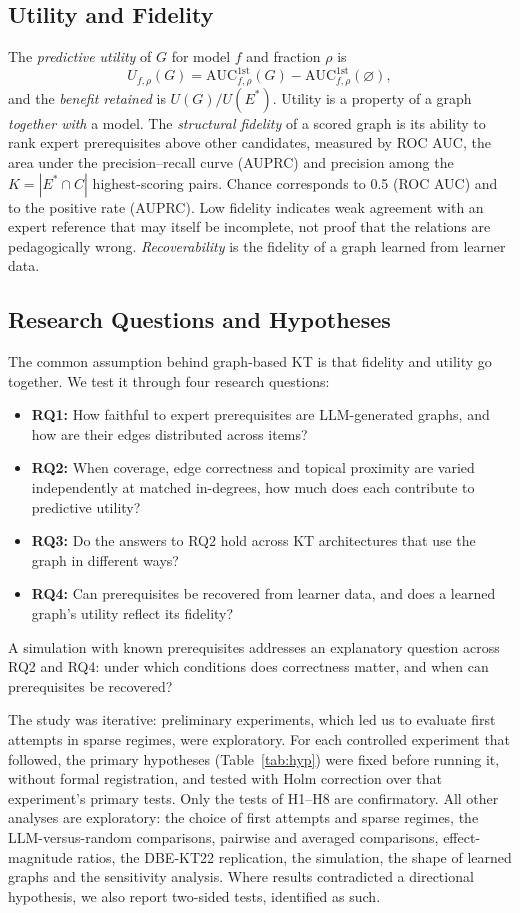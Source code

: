 \documentclass[lettersize,journal]{IEEEtran}
\newcommand{\aucfa}{\mathrm{AUC}^{\mathrm{1st}}}
\begin{document}
\subsection{Utility and Fidelity}
The \emph{predictive utility} of $G$ for model $f$ and fraction $\rho$ is
\begin{equation}
U_{f,\rho}(G)=\aucfa_{f,\rho}(G)-\aucfa_{f,\rho}(\varnothing),
\end{equation}
and the \emph{benefit retained} is $U(G)/U(E^*)$. Utility is a property of a graph \emph{together with} a model. The \emph{structural fidelity} of a scored graph is its ability to rank expert prerequisites above other candidates, measured by ROC AUC, the area under the precision--recall curve (AUPRC) and precision among the $K=|E^*\cap C|$ highest-scoring pairs. Chance corresponds to 0.5 (ROC AUC) and to the positive rate (AUPRC). Low fidelity indicates weak agreement with an expert reference that may itself be incomplete, not proof that the relations are pedagogically wrong. \emph{Recoverability} is the fidelity of a graph learned from learner data.

\subsection{Research Questions and Hypotheses}
The common assumption behind graph-based KT is that fidelity and utility go together. We test it through four research questions:
\begin{itemize}
\item \textbf{RQ1:} How faithful to expert prerequisites are LLM-generated graphs, and how are their edges distributed across items?
\item \textbf{RQ2:} When coverage, edge correctness and topical proximity are varied independently at matched in-degrees, how much does each contribute to predictive utility?
\item \textbf{RQ3:} Do the answers to RQ2 hold across KT architectures that use the graph in different ways?
\item \textbf{RQ4:} Can prerequisites be recovered from learner data, and does a learned graph's utility reflect its fidelity?
\end{itemize}
A simulation with known prerequisites addresses an explanatory question across RQ2 and RQ4: under which conditions does correctness matter, and when can prerequisites be recovered?

The study was iterative: preliminary experiments, which led us to evaluate first attempts in sparse regimes, were exploratory. For each controlled experiment that followed, the primary hypotheses (Table~\ref{tab:hyp}) were fixed before running it, without formal registration, and tested with Holm correction over that experiment's primary tests. Only the tests of H1--H8 are confirmatory. All other analyses are exploratory: the choice of first attempts and sparse regimes, the LLM-versus-random comparisons, pairwise and averaged comparisons, effect-magnitude ratios, the DBE-KT22 replication, the simulation, the shape of learned graphs and the sensitivity analysis. Where results contradicted a directional hypothesis, we also report two-sided tests, identified as such.
\end{document}
